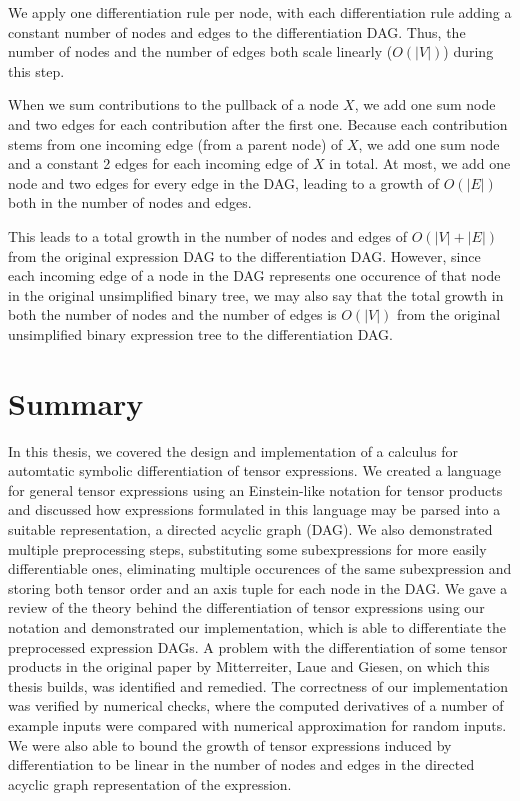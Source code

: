 \documentclass[12pt, a4paper]{report}
\begin{document}
We apply one differentiation rule per node, with each differentiation rule adding a constant number of nodes and edges to the differentiation DAG.
Thus, the number of nodes and the number of edges both scale linearly ($O(|V|)$) during this step.

When we sum contributions to the pullback of a node $X$, we add one sum node and two edges for each contribution after the first one.
Because each contribution stems from one incoming edge (from a parent node) of $X$, we add one sum node and a constant 2 edges for each incoming edge of $X$ in total.
At most, we add one node and two edges for every edge in the DAG, leading to a growth of $O(|E|)$ both in the number of nodes and edges.

This leads to a total growth in the number of nodes and edges of $O(|V| + |E|)$ from the original expression DAG to the differentiation DAG.
However, since each incoming edge of a node in the DAG represents one occurence of that node in the original unsimplified binary tree, we may also say that the total growth in both the number of nodes and the number of edges is $O(|V|)$ from the original unsimplified binary expression tree to the differentiation DAG.

\chapter{Summary}
In this thesis, we covered the design and implementation of a calculus for automtatic symbolic differentiation of tensor expressions.
We created a language for general tensor expressions using an Einstein-like notation for tensor products and discussed how expressions formulated in this language may be parsed into a suitable representation, a directed acyclic graph (DAG).
We also demonstrated multiple preprocessing steps, substituting some subexpressions for more easily differentiable ones, eliminating multiple occurences of the same subexpression and storing both tensor order and an axis tuple for each node in the DAG.
We gave a review of the theory behind the differentiation of tensor expressions using our notation and demonstrated our implementation, which is able to differentiate the preprocessed expression DAGs.
A problem with the differentiation of some tensor products in the original paper \cite{tensorpaper} by Mitterreiter, Laue and Giesen, on which this thesis builds, was identified and remedied.
The correctness of our implementation was verified by numerical checks, where the computed derivatives of a number of example inputs were compared with numerical approximation for random inputs.
We were also able to bound the growth of tensor expressions induced by differentiation to be linear in the number of nodes and edges in the directed acyclic graph representation of the expression.
\end{document}
